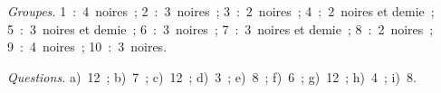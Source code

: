 \emph{Groupes.} 1~:~4~noires~; 2~:~3~noires~; 3~:~2~noires~; 4~:~2~noires et demie~; 5~:~3~noires et demie~; 6~:~3~noires~; 7~:~3~noires et demie~; 8~:~2~noires~; 9~:~4~noires~; 10~:~3~noires.

\emph{Questions.} a)~12~; b)~7~; c)~12~; d)~3~; e)~8~; f)~6~; g)~12~; h)~4~; i)~8.
